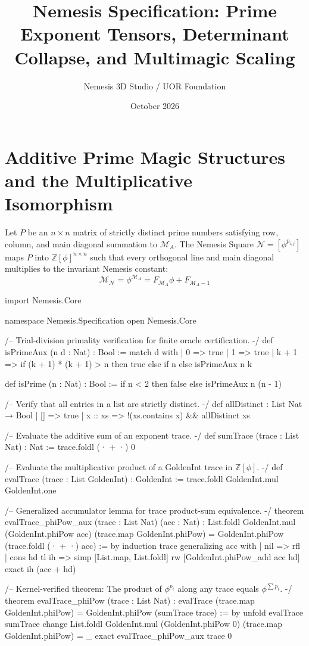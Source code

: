 \documentclass{article}
\title{Nemesis Specification: Prime Exponent Tensors, Determinant Collapse, and Multimagic Scaling}
\author{Nemesis 3D Studio / UOR Foundation}
\date{October 2026}
\begin{document}
\section{Additive Prime Magic Structures and the Multiplicative Isomorphism}
Let $P$ be an $n \times n$ matrix of strictly distinct prime numbers satisfying row, column, and main diagonal summation to $\mathcal{M}_A$. The Nemesis Square $\mathcal{N} = [\phi^{p_{i,j}}]$ maps $P$ into $\mathbb{Z}[\phi]^{n \times n}$ such that every orthogonal line and main diagonal multiplies to the invariant Nemesis constant:
$$\mathcal{M}_{\mathcal{N}} = \phi^{\mathcal{M}_A} = F_{\mathcal{M}_A}\phi + F_{\mathcal{M}_A - 1}$$

\begin{lean}
import Nemesis.Core

namespace Nemesis.Specification
open Nemesis.Core

/-- Trial-division primality verification for finite oracle certification. -/
def isPrimeAux (n d : Nat) : Bool :=
  match d with
  | 0 => true
  | 1 => true
  | k + 1 =>
    if (k + 1) * (k + 1) > n then true
    else if n %
    else isPrimeAux n k

def isPrime (n : Nat) : Bool :=
  if n < 2 then false
  else isPrimeAux n (n - 1)

/-- Verify that all entries in a list are strictly distinct. -/
def allDistinct : List Nat → Bool
  | [] => true
  | x :: xs => !(xs.contains x) && allDistinct xs

/-- Evaluate the additive sum of an exponent trace. -/
def sumTrace (trace : List Nat) : Nat :=
  trace.foldl (· + ·) 0

/-- Evaluate the multiplicative product of a GoldenInt trace in $\mathbb{Z}[\phi]$. -/
def evalTrace (trace : List GoldenInt) : GoldenInt :=
  trace.foldl GoldenInt.mul GoldenInt.one

/-- Generalized accumulator lemma for trace product-sum equivalence. -/
theorem evalTrace_phiPow_aux (trace : List Nat) (acc : Nat) :
  List.foldl GoldenInt.mul (GoldenInt.phiPow acc) (trace.map GoldenInt.phiPow) =
    GoldenInt.phiPow (trace.foldl (· + ·) acc) := by
  induction trace generalizing acc with
  | nil => rfl
  | cons hd tl ih =>
    simp [List.map, List.foldl]
    rw [GoldenInt.phiPow_add acc hd]
    exact ih (acc + hd)

/-- Kernel-verified theorem: The product of $\phi^{p_i}$ along any trace equals $\phi^{\sum p_i}$. -/
theorem evalTrace_phiPow (trace : List Nat) :
  evalTrace (trace.map GoldenInt.phiPow) = GoldenInt.phiPow (sumTrace trace) := by
  unfold evalTrace sumTrace
  change List.foldl GoldenInt.mul (GoldenInt.phiPow 0) (trace.map GoldenInt.phiPow) = _
  exact evalTrace_phiPow_aux trace 0


\end{lean}
\end{document}
